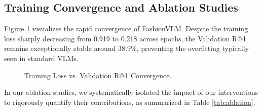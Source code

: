 \documentclass[conference]{IEEEtran}
\begin{document}
\subsection{Training Convergence and Ablation Studies}
Figure \ref{fig:line_chart} visualizes the rapid convergence of FashionVLM. Despite the training loss sharply decreasing from 0.919 to 0.218 across epochs, the Validation R@1 remains exceptionally stable around 38.9\%, preventing the overfitting typically seen in standard VLMs. 

\begin{figure}[htbp]
    \centering
    \caption{Training Loss vs. Validation R@1 Convergence.}
    \label{fig:line_chart}
\end{figure}

In our ablation studies, we systematically isolated the impact of our interventions to rigorously quantify their contributions, as summarized in Table \ref{tab:ablation}. 

\begin{table}[htbp]
\caption{Ablation Study of FashionVLM Interventions}
\label{tab:ablation}
\centering
{}
\end{table}
\end{document}
